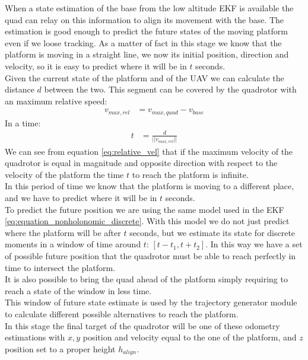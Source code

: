 When a state estimation of the base from the low altitude EKF is available the quad can relay on this information
to align its movement with the base. The estimation is good enough to predict the future states of the moving platform even if we loose tracking. As a matter of fact in this stage we know that the platform is moving in a straight line, we now its initial position, direction and velocity, so it is easy to predict where it will be in $t$ seconds.\\

Given the current state of the platform and of the UAV we can calculate the distance $d$ between the two. This segment can be covered by the quadrotor with an maximum relative speed:
\begin{align}
v_{max,rel} &= v_{max,quad} - v_{base}
\label{eq:relative_vel}
\end{align}
In a time:
\begin{align}
t &= \frac{d}{||v_{max,rel}||}
\end{align}
We can see from equation \ref{eq:relative_vel} that if the maximum velocity of the quadrotor  is equal in magnitude and opposite direction with respect to the velocity of the platform the time $t$ to reach the platform is infinite.\\

In this period of time we know that the platform is moving to a different place, and we have to predict where it will be in $t$ seconds.\\
To predict the future position we are using the same model used in the EKF \ref{eq:equation_nonholonomic_discrete}. With this model we do not just predict where the platform will be after $t$ seconds, but we estimate its state for discrete moments in a window of time around $t$: $[t-t_1,t+t_2]$. In this way we have a set of possible future position that the quadrotor must be able to reach perfectly in time to intersect the platform.\\
It is also possible to bring the quad ahead of the platform simply requiring to reach a state of the window in less time.\\

This window of future state estimate is used by the trajectory generator module to calculate different possible alternatives to reach the platform.\\
In this stage the final target of the quadrotor will be one of these odometry estimations with $x,y$ position and velocity equal to the one of the platform, and $z$ position set to a proper height $h_{align}$.\\

